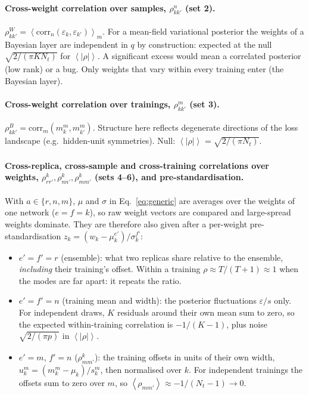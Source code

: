 \documentclass[11pt]{article}
\newcommand{\avg}[2]{\left\langle #1 \right\rangle_{#2}}
\begin{document}
\paragraph{Cross-weight correlation over samples, $\rho^{n}_{kk'}$ (set 2).} $\rho^{W}_{kk'} = \avg{\mathrm{corr}_n(\varepsilon_k, \varepsilon_{k'})}{m}$. For a
mean-field variational posterior the weights of a Bayesian layer are independent in $q$ by construction:
expected at the null $\sqrt{2/(\pi K N_t)}$ for $\avg{|\rho|}{}$. A significant excess would mean a correlated
posterior (low rank) or a bug. Only weights that vary within every training enter (the Bayesian layer).

\paragraph{Cross-weight correlation over trainings, $\rho^{m}_{kk'}$ (set 3).} $\rho^{B}_{kk'} = \mathrm{corr}_m(m_k^{m}, m_{k'}^{m})$. Structure here
reflects degenerate directions of the loss landscape (e.g.\ hidden-unit symmetries). Null:
$\avg{|\rho|}{} = \sqrt{2/(\pi N_t)}$.

\paragraph{Cross-replica, cross-sample and cross-training correlations over weights, $\rho^{k}_{rr'}, \rho^{k}_{nn'}, \rho^{k}_{mm'}$ (sets 4--6), and pre-standardisation.} With $a\in\{r,n,m\}$, $\mu$ and $\sigma$ in
Eq.~\eqref{eq:generic} are averages over the weights of one network ($e=f=k$), so raw weight vectors are
compared and large-spread weights dominate. They are therefore also given after a per-weight
pre-standardisation $z_k = (w_k - \mu_k^{e'})/\sigma_k^{f'}$:
\begin{itemize}
  \item $e'=f'=r$ (ensemble): what two replicas share relative to the ensemble, \emph{including} their training's
    offset. Within a training $\rho \approx T/(T+1) \approx 1$ when the modes are far apart: it repeats the ratio.
  \item $e'=f'=n$ (training mean and width): the posterior fluctuations $\varepsilon/s$ only. For independent
    draws, $K$ residuals around their own mean sum to zero, so the expected within-training correlation is
    $-1/(K-1)$, plus noise $\sqrt{2/(\pi p)}$ in $\avg{|\rho|}{}$.
  \item $e'=m$, $f'=n$ ($\rho^{k}_{mm'}$): the training offsets in units of their own width,
    $u_k^{m} = (m_k^{m}-\mu_k)/s_k^{m}$, then normalised over $k$. For independent trainings the offsets sum to
    zero over $m$, so $\avg{\rho_{mm'}}{} \approx -1/(N_t-1) \to 0$.
\end{itemize}
\end{document}
